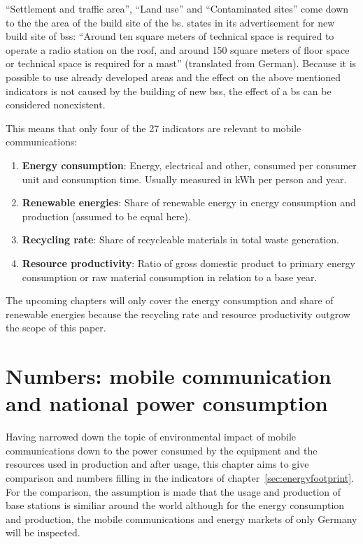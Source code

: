 \documentclass[11pt,a4paper]{article}
\begin{document}
\enquote{Settlement and traffic area}, \enquote{Land use} and \enquote{Contaminated sites} come down to the the area of the build site of the \acrshort{bs}.
\citep{BSStandort} states in its advertisement for new build site of \acrshort{bs}s: \enquote{Around ten square meters of technical space is required to operate a radio station on the roof, and around 150 square meters of floor space or technical space is required for a mast} (translated from German).
Because it is possible to use already developed areas and the effect on the above mentioned indicators is not caused by the building of new \acrshort{bs}s, the effect of a \acrshort{bs} can be considered nonexistent.

This means that only four of the 27 indicators are relevant to mobile communications:
\begin{enumerate}
  \item \textbf{Energy consumption}: Energy, electrical and other, consumed per consumer unit and consumption time. Usually measured in kWh per person and year.
  \item \textbf{Renewable energies}: Share of renewable energy in energy consumption and production (assumed to be equal here).
  \item \textbf{Recycling rate}: Share of recycleable materials in total waste generation.
  \item \textbf{Resource productivity}: Ratio of gross domestic product to primary energy consumption or raw material consumption in relation to a base year.
\end{enumerate}

The upcoming chapters will only cover the energy consumption and share of renewable energies because the recycling rate and resource productivity outgrow the scope of this paper.

\section{Numbers: mobile communication and national power consumption}\label{sec:influence}

Having narrowed down the topic of environmental impact of mobile communications down to the power consumed by the equipment and the resources used in production and after usage, this chapter aims to give comparison and numbers filling in the indicators of chapter~\ref{sec:energyfootprint}.
For the comparison, the assumption is made that the usage and production of base stations is similiar around the world although for the energy consumption and production, the mobile communications and energy markets of only Germany will be inspected. 
\end{document}
